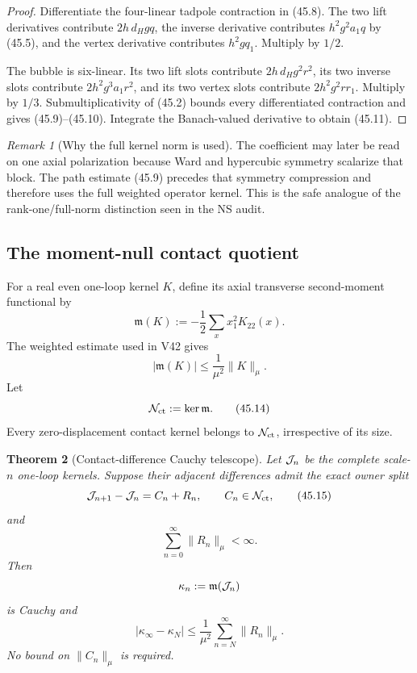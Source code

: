 \documentclass[11pt,oneside]{book}
\newtheorem{theorem}{Theorem}[chapter]
\theoremstyle{definition}
\theoremstyle{remark}
\newtheorem{remark}[theorem]{Remark}
\begin{document}
\begin{proof}
Differentiate the four-linear tadpole contraction in (45.8).
The two lift derivatives contribute
\(2h\,d_Hgq\), the inverse derivative contributes
\(h^2g^2a_1q\) by (45.5), and the vertex derivative contributes
\(h^2gq_1\).  Multiply by \(1/2\).

The bubble is six-linear.  Its two lift slots contribute
\(2h\,d_Hg^2r^2\), its two inverse slots contribute
\(2h^2g^3a_1r^2\), and its two vertex slots contribute
\(2h^2g^2rr_1\).  Multiply by \(1/3\).  Submultiplicativity of
(45.2) bounds every differentiated contraction and gives
(45.9)--(45.10).  Integrate the Banach-valued derivative to obtain
(45.11).
\end{proof}

\begin{remark}[Why the full kernel norm is used]
\label{rem:e8v45-full-kernel}
The coefficient may later be read on one axial polarization because
Ward and hypercubic symmetry scalarize that block.  The path estimate
(45.9) precedes that symmetry compression and therefore uses the
full weighted operator kernel.  This is the safe analogue of the
rank-one/full-norm distinction seen in the NS audit.
\end{remark}

\subsection{The moment-null contact quotient}

For a real even one-loop kernel \(K\), define its axial transverse
second-moment functional by
\[
 {\mathfrak m}(K)
 :=-\frac12\sum_xx_1^2K_{22}(x).                               \tag{45.12}
\]
The weighted estimate used in V42 gives
\[
 |{\mathfrak m}(K)|\le\frac1{\mu^2}\|K\|_\mu.                  \tag{45.13}
\]
Let
\[
 {\cal N}_{\rm ct}:=\ker{\mathfrak m}.                          \tag{45.14}
\]
Every zero-displacement contact kernel belongs to
\({\cal N}_{\rm ct}\), irrespective of its size.

\begin{theorem}[Contact-difference Cauchy telescope]
\label{thm:e8v45-contact-Cauchy}
Let \({\cal J}_n\) be the complete scale-\(n\) one-loop kernels.
Suppose their adjacent differences admit the exact owner split
\[
 {\cal J}_{n+1}-{\cal J}_n=C_n+R_n,\qquad
 C_n\in{\cal N}_{\rm ct},                                      \tag{45.15}
\]
and
\[
 \sum_{n=0}^\infty\|R_n\|_\mu<\infty.                          \tag{45.16}
\]
Then
\[
 \kappa_n:={\mathfrak m}({\cal J}_n)
\]
is Cauchy and
\[
 \boxed{
 |\kappa_\infty-\kappa_N|
 \le\frac1{\mu^2}\sum_{n=N}^\infty\|R_n\|_\mu.}                \tag{45.17}
\]
No bound on \(\|C_n\|_\mu\) is required.
\end{theorem}
\end{document}
